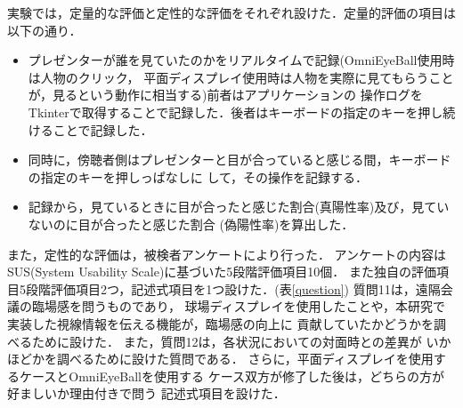 









実験では，定量的な評価と定性的な評価をそれぞれ設けた．定量的評価の項目は
以下の通り．

\begin{itemize}
  \item プレゼンターが誰を見ていたのかをリアルタイムで記録(OmniEyeBall使用時は人物のクリック，
  平面ディスプレイ使用時は人物を実際に見てもらうことが，見るという動作に相当する)前者はアプリケーションの
  操作ログをTkinterで取得することで記録した．後者はキーボードの指定のキーを押し続けることで記録した．
  \item 同時に，傍聴者側はプレゼンターと目が合っていると感じる間，キーボードの指定のキーを押しっぱなしに
  して，その操作を記録する．
  \item 記録から，見ているときに目が合ったと感じた割合(真陽性率)及び，見ていないのに目が合ったと感じた割合
  (偽陽性率)を算出した．
\end{itemize}

また，定性的な評価は，被検者アンケートにより行った．
アンケートの内容は
SUS(System Usability Scale)に基づいた5段階評価項目10個．
また独自の評価項目5段階評価項目2つ，記述式項目を1つ設けた．(表\ref{question})
質問11は，遠隔会議の臨場感を問うものであり，
球場ディスプレイを使用したことや，本研究で
実装した視線情報を伝える機能が，臨場感の向上に
貢献していたかどうかを調べるために設けた．
また，質問12は，各状況においての対面時との差異が
いかほどかを調べるために設けた質問である．
さらに，平面ディスプレイを使用するケースとOmniEyeBallを使用する
ケース双方が修了した後は，どちらの方が好ましいか理由付きで問う
記述式項目を設けた．

